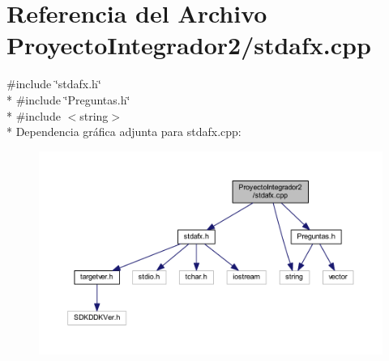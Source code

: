 \section{Referencia del Archivo Proyecto\-Integrador2/stdafx.cpp}
\label{stdafx_8cpp}
{\ttfamily \#include \char`\"{}stdafx.\-h\char`\"{}}\\*
{\ttfamily \#include \char`\"{}Preguntas.\-h\char`\"{}}\\*
{\ttfamily \#include $<$string$>$}\\*
Dependencia gráfica adjunta para stdafx.\-cpp\-:
\nopagebreak
\begin{figure}[H]
\begin{center}
\leavevmode
\includegraphics[width=350pt]{stdafx_8cpp__incl}
\end{center}
\end{figure}
